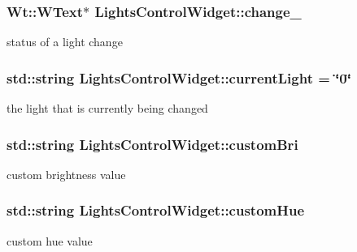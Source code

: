 \subsubsection[{\texorpdfstring{change\+\_\+}{change_}}]{\setlength{\rightskip}{0pt plus 5cm}Wt\+::\+W\+Text$\ast$ Lights\+Control\+Widget\+::change\+\_\+\hspace{0.3cm}{\ttfamily [private]}}\hypertarget{classLightsControlWidget_a27b0c91e6a4776c8b03dfc5324e3e365}{}\label{classLightsControlWidget_a27b0c91e6a4776c8b03dfc5324e3e365}
status of a light change 
\subsubsection[{\texorpdfstring{current\+Light}{currentLight}}]{\setlength{\rightskip}{0pt plus 5cm}std\+::string Lights\+Control\+Widget\+::current\+Light = \char`\"{}0\char`\"{}\hspace{0.3cm}{\ttfamily [private]}}\hypertarget{classLightsControlWidget_ace513933420460bc8fbb508d865491d4}{}\label{classLightsControlWidget_ace513933420460bc8fbb508d865491d4}
the light that is currently being changed 
\subsubsection[{\texorpdfstring{custom\+Bri}{customBri}}]{\setlength{\rightskip}{0pt plus 5cm}std\+::string Lights\+Control\+Widget\+::custom\+Bri\hspace{0.3cm}{\ttfamily [private]}}\hypertarget{classLightsControlWidget_a5d4fcb296c966e544f26269debbc0a85}{}\label{classLightsControlWidget_a5d4fcb296c966e544f26269debbc0a85}
custom brightness value 
\subsubsection[{\texorpdfstring{custom\+Hue}{customHue}}]{\setlength{\rightskip}{0pt plus 5cm}std\+::string Lights\+Control\+Widget\+::custom\+Hue\hspace{0.3cm}{\ttfamily [private]}}\hypertarget{classLightsControlWidget_a2db5ec044ec1156bf73dc2ae0a997289}{}\label{classLightsControlWidget_a2db5ec044ec1156bf73dc2ae0a997289}
custom hue value 
